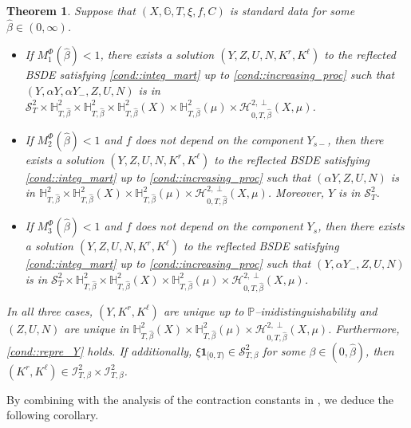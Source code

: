 \documentclass[10pt]{article} %
\newtheorem{theorem}{Theorem}[section]
\newcommand\cH{\mathcal H}
\newcommand\cI{\mathcal I}
\newcommand\cS{\mathcal S}
\def \G{\mathbb{G}}
\def \H{\mathbb{H}}
\def \P{\mathbb{P}}
\newcommand{\1}{\mathbf{1}}
\begin{document}
\begin{theorem}\label{thm::main}
	Suppose that $(X,\G,T,\xi,f,C)$ is standard data for some $\hat\beta \in (0,\infty)$.	
	\begin{itemize}
	\item[$(i)$] If $M_1^\Phi(\hat\beta) < 1$, there exists a solution $(Y,Z,U,N,K^r,K^\ell)$ to the reflected {\rm BSDE} satisfying \ref{cond::integ_mart} up to \ref{cond::increasing_proc} such that $(Y,\alpha Y,\alpha Y_-,Z,U,N)$ is in $\cS^2_T \times \H^2_{T,\hat\beta} \times \H^2_{T,\hat\beta} \times \H^2_{T,\hat\beta}(X) \times \H^2_{T,\hat\beta}(\mu) \times \cH^{2,\perp}_{0,T,\hat\beta}(X,\mu)$. 
	
	\item[$(ii)$] If $M_2^\Phi(\hat\beta) < 1$ and $f$ does not depend on the component $Y_{s-}$, then there exists a solution $(Y,Z,U,N,K^r,K^\ell)$ to the reflected {\rm BSDE} satisfying \ref{cond::integ_mart} up to \ref{cond::increasing_proc} such that $(\alpha Y,Z,U,N)$ is in $\H^2_{T,\hat\beta} \times \H^2_{T,\hat\beta}(X) \times \H^2_{T,\hat\beta}(\mu) \times \cH^{2,\perp}_{0,T,\hat\beta}(X,\mu)$. Moreover, $Y$ is in $\cS^2_T$.
	
	\item[$(iii)$] If $M_3^\Phi(\hat\beta) < 1$ and $f$ does not depend on the component $Y_s$, then there exists a solution $(Y,Z,U,N,K^r,K^\ell)$ to the reflected {\rm BSDE} satisfying \ref{cond::integ_mart} up to \ref{cond::increasing_proc} such that $(Y,\alpha Y_-,Z,U,N)$ is in $\cS^2_T \times \H^2_{T,\hat\beta} \times \H^2_{T,\hat\beta}(X) \times \H^2_{T,\hat\beta}(\mu) \times \cH^{2,\perp}_{0,T,\hat\beta}(X,\mu)$. 
	\end{itemize}
	In all three cases, $(Y,K^r,K^\ell)$ are unique up to $\P$--inidistinguishability and $(Z,U,N)$ are unique in $\H^2_{T,\hat\beta}(X) \times \H^2_{T,\hat\beta}(\mu) \times \cH^{2,\perp}_{0,T,\hat\beta}(X,\mu)$. Furthermore, \ref{cond::repre_Y} holds. 
	If additionally, $\xi\mathbf{1}_{[0,T)} \in \cS^2_{T,\beta}$ for some $\beta \in (0,\hat\beta)$, then $(K^r,K^\ell) \in \cI^2_{T,\beta} \times \cI^2_{T,\beta}$.
\end{theorem}

By combining  with the analysis of the contraction constants in , we deduce the following corollary.
\end{document}
